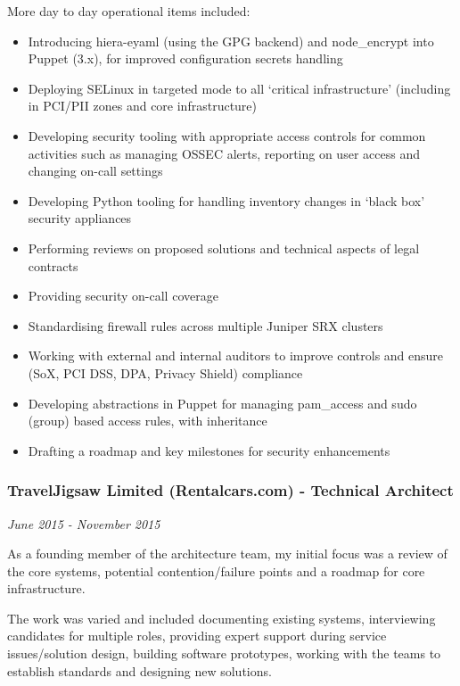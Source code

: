 More day to day operational items included:

\begin{itemize}
\tightlist
\item
  Introducing hiera-eyaml (using the GPG backend) and node\_encrypt into
  Puppet (3.x), for improved configuration secrets handling
\item
  Deploying SELinux in targeted mode to all `critical infrastructure'
  (including in PCI/PII zones and core infrastructure)
\item
  Developing security tooling with appropriate access controls for
  common activities such as managing OSSEC alerts, reporting on user
  access and changing on-call settings
\item
  Developing Python tooling for handling inventory changes in `black
  box' security appliances
\item
  Performing reviews on proposed solutions and technical aspects of
  legal contracts
\item
  Providing security on-call coverage
\item
  Standardising firewall rules across multiple Juniper SRX clusters
\item
  Working with external and internal auditors to improve controls and
  ensure (SoX, PCI DSS, DPA, Privacy Shield) compliance
\item
  Developing abstractions in Puppet for managing pam\_access and sudo
  (group) based access rules, with inheritance
\item
  Drafting a roadmap and key milestones for security enhancements
\end{itemize}

\hypertarget{traveljigsaw-limited-rentalcars.com---technical-architect}{%
\subsubsection{TravelJigsaw Limited (Rentalcars.com) - Technical
Architect}\label{traveljigsaw-limited-rentalcars.com---technical-architect}}

\emph{June 2015 - November 2015}

As a founding member of the architecture team, my initial focus was a
review of the core systems, potential contention/failure points and a
roadmap for core infrastructure.

The work was varied and included documenting existing systems,
interviewing candidates for multiple roles, providing expert support
during service issues/solution design, building software prototypes,
working with the teams to establish standards and designing new
solutions.

